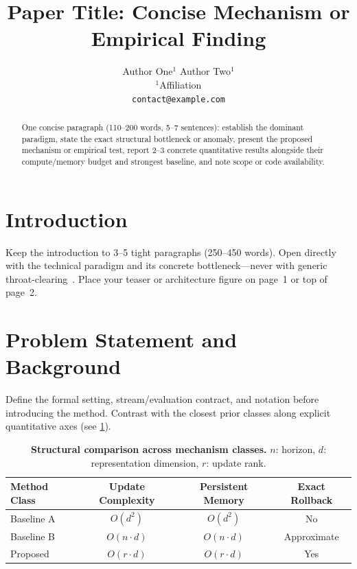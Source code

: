 \documentclass[11pt]{article}
\title{\textbf{Paper Title: Concise Mechanism or Empirical Finding}}
\author{
  Author One$^{1}$ \quad Author Two$^{1}$ \\
  $^{1}$Affiliation \\
  \texttt{contact@example.com}
}
\date{}
\begin{document}
\maketitle

\begin{abstract}
One concise paragraph (110--200 words, 5--7 sentences): establish the dominant
paradigm, state the exact structural bottleneck or anomaly, present the proposed
mechanism or empirical test, report 2--3 concrete quantitative results alongside
their compute/memory budget and strongest baseline, and note scope or code availability.
\end{abstract}

\section{Introduction}
\label{sec:intro}

Keep the introduction to 3--5 tight paragraphs (250--450 words). Open directly
with the technical paradigm and its concrete bottleneck---never with generic
throat-clearing~\citep{vaswani2017attention,he2016deep,hu2022lora}. Place your
teaser or architecture figure on page~1 or top of page~2.

\section{Problem Statement and Background}
\label{sec:background}

Define the formal setting, stream/evaluation contract, and notation before
introducing the method. Contrast with the closest prior classes along explicit
quantitative axes (see \cref{tab:axes}).

\begin{table}[t]
\centering
\caption{\textbf{Structural comparison across mechanism classes.}
$n$: horizon, $d$: representation dimension, $r$: update rank.}
\label{tab:axes}
\begin{tabular}{lccc}
\toprule
Method Class & Update Complexity & Persistent Memory & Exact Rollback \\
\midrule
Baseline A & $O(d^2)$ & $O(d^2)$ & No \\
Baseline B & $O(n \cdot d)$ & $O(n \cdot d)$ & Approximate \\
Proposed & $O(r \cdot d)$ & $O(r \cdot d)$ & Yes \\
\bottomrule
\end{tabular}
\end{table}
\end{document}
